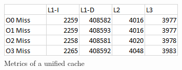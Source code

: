 \documentclass{article}
\begin{document}
        \begin{figure}[H]
            \label{fig:dry_table}
            \begin{center}
                \includegraphics[width=\textwidth]{dry_table.png}
                \caption{Metrics of a unified cache}
            \end{center}
        \end{figure}
\end{document}
